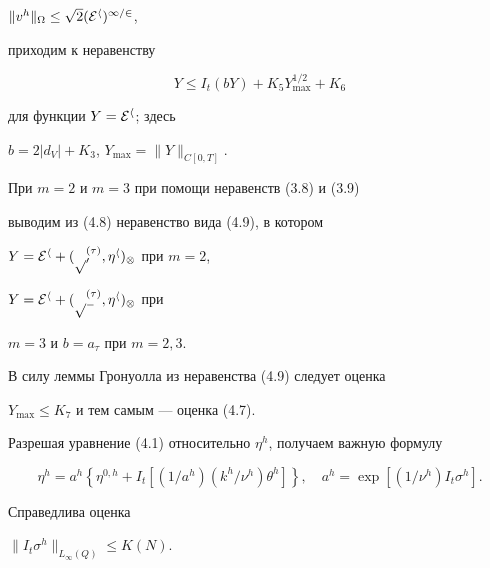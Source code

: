 \documentclass[12pt]{article}
\theoremstyle{plain} %
\newtheorem{lemm}{\hskip\parindent Лемма}[section]
\theoremstyle{definition}
\numberwithin{equation}{section}
\begin{document}
\begin{pf}
$\|v^h\|_{\Omega}\le\sqrt{2}(\cal E^h)^{1/2}$,


приходим к неравенству


\begin{equation}


Y\le I_t(bY)+K_5 Y_{\max}^{1/2}+K_6


\end{equation}


для функции $Y=\cal E^h$; здесь


$b=2|d_V|+K_3$, $Y_{\max}= \|Y\|_{C[0,T]}$.





При $m=2$ и $m=3$ при помощи неравенств (3.8) и (3.9)


выводим из (4.8) неравенство вида (4.9), в котором


$Y = \cal E^h +(p^{(\tau)}_0,\eta^h)_\Omega$ при $m=2$,


$Y = \cal E^h +(p^{(\tau)}_\Gamma,\eta^h)_\Omega$ при


$m=3$ и $b=a_\tau$ при $m=2,3$.





В силу леммы Гронуолла из неравенства (4.9) следует оценка


$Y_{\max}\le K_7$ и тем самым --- оценка (4.7).


\end{pf}





Разрешая уравнение (4.1) относительно $\eta^h$, получаем важную формулу


\begin{equation}


\eta^h = a^h\left\{\eta^{0,h} +


I_t\left[(1/a^h)(k^h/\nu^h)\theta^h \right]\right\},


\quad a^h = \exp\left[(1/\nu^h)I_t\sigma^h\right].


\end{equation}





\begin{lemm} Справедлива оценка


$\|I_t\sigma^h\|_{L_\infty(Q)}\le K(N)$.


\end{lemm}
\end{document}
